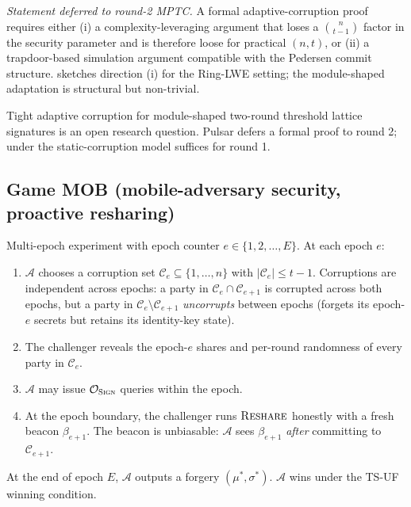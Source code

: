 \begin{theorem}
\label{thm:adapt-sketch}
\emph{Statement deferred to round-2 MPTC.} A formal
adaptive-corruption proof requires either (i) a complexity-leveraging
argument that loses a $\binom{n}{t-1}$ factor in the security
parameter and is therefore loose for practical $(n, t)$, or (ii) a
trapdoor-based simulation argument compatible with the Pedersen
commit structure. \cite{boschini2024ringtail} sketches direction (i) for the
Ring-LWE setting; the module-shaped adaptation is structural but
non-trivial.
\end{theorem}

\begin{openq}
Tight adaptive corruption for module-shaped two-round
threshold lattice signatures is an open research question. Pulsar
defers a formal proof to round 2; under the static-corruption model
 suffices for round 1.
\end{openq}

\subsection{Game MOB (mobile-adversary security, proactive resharing)}
\label{sec:game-mob}

\begin{game}[MOB]
\label{game:mob}
Multi-epoch experiment with epoch counter $e \in \{1, 2, \dots, E\}$.
At each epoch $e$:
\begin{enumerate}[leftmargin=*, itemsep=0pt]
\item $\mathcal{A}$ chooses a corruption set $\mathcal{C}_e \subseteq \{1, \dots, n\}$ with $|\mathcal{C}_e| \le t-1$. Corruptions are independent across epochs: a party in $\mathcal{C}_e \cap \mathcal{C}_{e+1}$ is corrupted across both epochs, but a party in $\mathcal{C}_e \setminus \mathcal{C}_{e+1}$ \emph{uncorrupts} between epochs (forgets its epoch-$e$ secrets but retains its identity-key state).
\item The challenger reveals the epoch-$e$ shares and per-round randomness of every party in $\mathcal{C}_e$.
\item $\mathcal{A}$ may issue $\mathcal{O}_{\textsc{Sign}}$ queries within the epoch.
\item At the epoch boundary, the challenger runs $\textsc{Reshare}$ honestly with a fresh beacon $\beta_{e+1}$. The beacon is unbiasable: $\mathcal{A}$ sees $\beta_{e+1}$ \emph{after} committing to $\mathcal{C}_{e+1}$.
\end{enumerate}
At the end of epoch $E$, $\mathcal{A}$ outputs a forgery
$(\mu^*, \sigma^*)$. $\mathcal{A}$ wins under the TS-UF winning
condition.
\end{game}

